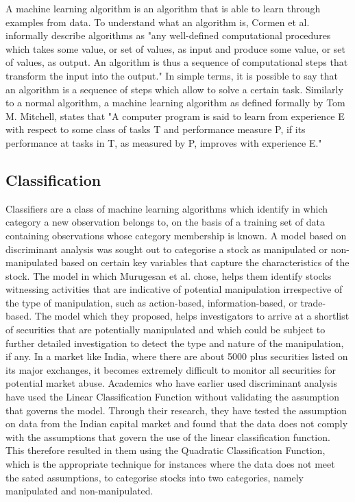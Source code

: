 A machine learning algorithm is an algorithm that is able to learn through examples from data. To understand what an algorithm is, Cormen et al. informally describe algorithms as "any well-defined computational procedures which takes some value, or set of values, as input and produce some value, or set of values, as output. An algorithm is thus a sequence of computational steps that transform the input into the output."\cite{Cormen:2009aa} In simple terms, it is possible to say that an algorithm is a sequence of steps which allow to solve a certain task. Similarly to a normal algorithm, a machine learning algorithm as defined formally by Tom M. Mitchell, states that "A computer program is said to learn from experience E with respect to some class of tasks T and performance measure P, if its performance at tasks in T, as measured by P, improves with experience E."\cite{Mitchell:1997aa}

\subsection{Classification}

Classifiers are a class of machine learning algorithms which identify in which category a new observation belongs to, on the basis of a training set of data containing observations whose category membership is known. A model based on discriminant analysis was sought out to categorise a stock as manipulated or non-manipulated based on certain key variables that capture the characteristics of the stock.\cite{Murugesan:2012aa} The model in which Murugesan et al. chose, helps them identify stocks witnessing activities that are indicative of potential manipulation irrespective of the type of manipulation, such as action-based, information-based, or trade-based. The model which they proposed, helps investigators to arrive at a shortlist of securities that are potentially manipulated and which could be subject to further detailed investigation to detect the type and nature of the manipulation, if any. In a market like India, where there are about 5000 plus securities listed on its major exchanges, it becomes extremely difficult to monitor all securities for potential market abuse. Academics who have earlier used discriminant analysis have used the Linear Classification Function without validating the assumption that governs the model. Through their research, they have tested the assumption on data from the Indian capital market and found that the data does not comply with the assumptions that govern the use of the linear classification function. This therefore resulted in them using the Quadratic Classification Function, which is the appropriate technique for instances where the data does not meet the sated assumptions, to categorise stocks into two categories, namely manipulated and non-manipulated.

